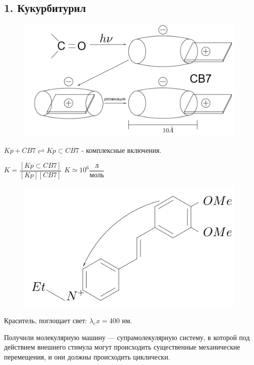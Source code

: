 
\begin{lecture}
\begin{lecSection}[Кавитанты]

\subsection{1. Кукурбитурил}

	\begin{figure}[H]

		\centering\includegraphics[width=0.9\linewidth]{lecture_09/pic1}
	
\end{figure}

$Kp + CB7 \rightleftharpoons Kp \subset CB7$ - комплексные включения.
\par $K = \dfrac{\left[ Kp \subset CB7 \right]}{[Kp][CB7]}$   $K \simeq 10^6 \dfrac{\text{л}}{\text{моль}}$

	\begin{figure}[H]
	
	\centering\includegraphics[width=0.6\linewidth]{lecture_09/pic2}
	
\end{figure}

\par Краситель, поглощает свет: $\lambda_ex = 400$ нм.
\par Получили молекулярную машину --- супрамолекулярную систему, в которой под действием внешнего стимула могут происходить существенные механические перемещения, и они должны происходить циклически. 


\end{lecSection}
\end{lecture}
